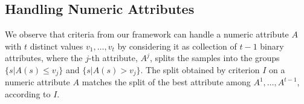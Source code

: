 \subsection{Handling Numeric Attributes}
We observe  that criteria from our framework can handle
 a numeric attribute $A$ with $t$ distinct values
$v_1,\ldots,v_t$
by considering it as collection of 
$t-1$ binary attributes, where the
$j$-th attribute, $A^j$,  splits the samples into the
groups $\{s | A(s) \le v_j \}$ and $\{s | A(s) > v_j \}$. 
The split  obtained by criterion $I$ on a numeric attribute
$A$ matches the split of  the best attribute 
among $A^1,\ldots,A^ {t-1}$, according to $I$.
